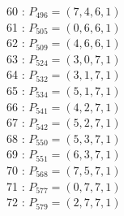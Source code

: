 \documentclass{article}
\begin{document}
{\begin{multicols}{3}
60 : $P_{496}=( 7, 4, 6, 1 )$\\
61 : $P_{505}=( 0, 6, 6, 1 )$\\
62 : $P_{509}=( 4, 6, 6, 1 )$\\
63 : $P_{524}=( 3, 0, 7, 1 )$\\
64 : $P_{532}=( 3, 1, 7, 1 )$\\
65 : $P_{534}=( 5, 1, 7, 1 )$\\
66 : $P_{541}=( 4, 2, 7, 1 )$\\
67 : $P_{542}=( 5, 2, 7, 1 )$\\
68 : $P_{550}=( 5, 3, 7, 1 )$\\
69 : $P_{551}=( 6, 3, 7, 1 )$\\
70 : $P_{568}=( 7, 5, 7, 1 )$\\
71 : $P_{577}=( 0, 7, 7, 1 )$\\
72 : $P_{579}=( 2, 7, 7, 1 )$\\
\end{multicols}


%


%


}%
\end{document}
